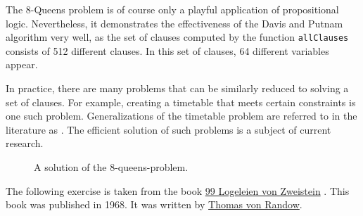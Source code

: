 The 8-Queens problem is of course only a playful application of propositional logic.
Nevertheless, it demonstrates the effectiveness of the Davis and Putnam algorithm very well, as the set of clauses computed by the function \texttt{allClauses}
consists of 512 different clauses. In this set of clauses, 64 different
variables appear.

In practice, there are many problems that can be similarly reduced to solving a
set of clauses. For example, creating a timetable that meets certain constraints is one such problem. Generalizations of the
timetable problem are referred to in the literature as .
The efficient solution of such problems is a subject of current research.

\begin{figure}[!ht]
  \centering
  \caption{A solution of the 8-queens-problem.}
  \label{fig:8-queens.pdf}
\end{figure}
\FloatBarrier
\vspace*{\fill}

\pagebreak

\exerciseEng
The following exercise is taken from the book 
\href{https://www.amazon.de/Logeleien-Zweistein-ihren-Antworten-Wegner/dp/B006YF0VUE}{99 Logeleien von
  Zweistein} \cite{randow:1968}.
This book was published in 1968.  It was written by 
\href{http://de.wikipedia.org/wiki/Thomas_von_Randow}{Thomas von Randow}.


